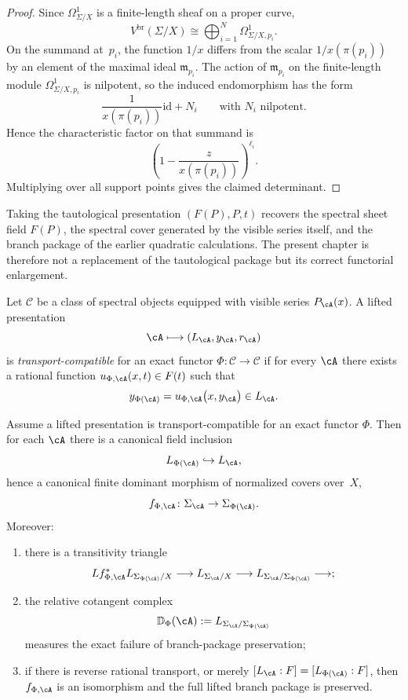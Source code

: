 \begin{proof}
Since $\Omega^1_{\Sigma/X}$ is a finite-length sheaf on a proper curve,
\[
V^{\mathrm{br}}(\Sigma/X)
\cong
\bigoplus_{i=1}^{N}\Omega^1_{\Sigma/X,p_i}.
\]
On the summand at~$p_i$, the function $1/x$ differs from the scalar
$1/x(\pi(p_i))$ by an element of the maximal ideal
$\mathfrak m_{p_i}$.  The action of $\mathfrak m_{p_i}$ on the finite-length
module $\Omega^1_{\Sigma/X,p_i}$ is nilpotent, so the induced endomorphism has
the form
\[
\frac{1}{x(\pi(p_i))}\mathrm{id}+N_i
\qquad\text{with }N_i\text{ nilpotent}.
\]
Hence the characteristic factor on that summand is
\[
\left(1-\frac{z}{x(\pi(p_i))}\right)^{\ell_i}.
\]
Multiplying over all support points gives the claimed determinant.
\end{proof}

\begin{remark}
\label{rem:tautological-specialization}
Taking the tautological presentation $(F(P),P,t)$ recovers the spectral sheet
field $F(P)$, the spectral cover generated by the visible series itself, and the
branch package of the earlier quadratic calculations.  The present chapter is
therefore not a replacement of the tautological package but its correct
functorial enlargement.
\end{remark}

\begin{definition}
\label{def:transport-compatible-presentation}
Let $\mathcal C$ be a class of spectral objects equipped with visible series
$P_{\cA}(x)$.  A lifted presentation
\[
\cA\longmapsto (L_{\cA},y_{\cA},r_{\cA})
\]
is \emph{transport-compatible} for an exact functor $\Phi\colon\mathcal C\to
\mathcal C$ if for every $\cA$ there exists a rational function
$u_{\Phi,\cA}(x,t)\in F(t)$ such that
\[
y_{\Phi(\cA)}=u_{\Phi,\cA}\bigl(x,y_{\cA}\bigr)
\in L_{\cA}.
\]
\end{definition}

\begin{theorem}
\label{thm:transport-lifted-covers}
Assume a lifted presentation is transport-compatible for an exact functor
$\Phi$.  Then for each $\cA$ there is a canonical field inclusion
\[
L_{\Phi(\cA)}\hookrightarrow L_{\cA},
\]
hence a canonical finite dominant morphism of normalized covers over~$X$,
\[
f_{\Phi,\cA}\colon \Sigma_{\cA}\to \Sigma_{\Phi(\cA)}.
\]
Moreover:
\begin{enumerate}[label=\textup{(\roman*)}]
\item there is a transitivity triangle
\[
Lf_{\Phi,\cA}^*L_{\Sigma_{\Phi(\cA)}/X}
\longrightarrow
L_{\Sigma_{\cA}/X}
\longrightarrow
L_{\Sigma_{\cA}/\Sigma_{\Phi(\cA)}}
\longrightarrow;
\]
\item the relative cotangent complex
\[
\mathbb D_{\Phi}(\cA):=L_{\Sigma_{\cA}/\Sigma_{\Phi(\cA)}}
\]
measures the exact failure of branch-package preservation;
\item if there is reverse rational transport, or merely
$[L_{\cA}:F]=[L_{\Phi(\cA)}:F]$, then $f_{\Phi,\cA}$ is an isomorphism and the
full lifted branch package is preserved.
\end{enumerate}
\end{theorem}

